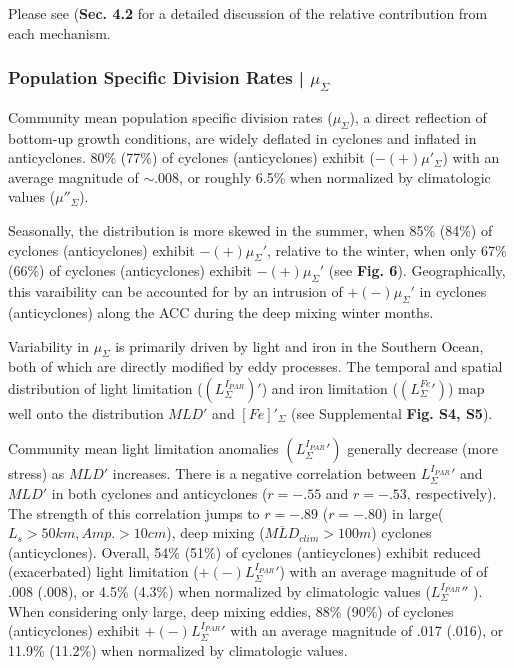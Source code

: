 Please see (\textbf{Sec. 4.2} for a detailed discussion of the relative contribution from each mechanism.  




\subsubsection{Population Specific Division Rates | $\mu_\Sigma$ }

Community mean population specific division rates ($\mu_\Sigma$), a direct reflection of bottom-up growth conditions, are widely deflated in cyclones and inflated in anticyclones. 80\% (77\%) of cyclones (anticyclones) exhibit ($-(+)\mu'_\Sigma$) with an average magnitude of $\sim.008$, or roughly 6.5\% when normalized by climatologic values ($\mu''_\Sigma$). 

Seasonally, the distribution is more skewed in the summer, when 85\% (84\%) of cyclones (anticyclones) exhibit $-(+)\mu_\Sigma'$, relative to the winter, when only 67\% (66\%) of cyclones (anticyclones) exhibit $-(+)\mu_\Sigma'$ (see \textbf{Fig. 6}). Geographically, this varaibility can be accounted for by an intrusion of $+(-)\mu_\Sigma'$ in cyclones (anticyclones) along the ACC during the deep mixing winter months. 

Variability in $\mu_\Sigma$ is primarily driven by light \parencite{Fauchereauresponsephytoplanktonbiomass2011} and iron \parencite{BoydEnvironmentalFactorsControlling2002} in the Southern Ocean, both of which are directly modified by eddy processes. The temporal and spatial distribution of light limitation ($(L_\Sigma^{I_{PAR}})'$) and iron limitation ($(L_\Sigma^{Fe}')$) map well onto the distribution $MLD'$ and $[Fe]'_\Sigma$ (see Supplemental \textbf{Fig. S4, S5}).

Community mean light limitation anomalies $(L_\Sigma^{I_{PAR}}')$ generally decrease (more stress) as $MLD'$ increases. There is a negative correlation between $L_\Sigma^{I_{PAR}}'$ and $MLD'$ in both cyclones and anticyclones ($r=-.55$ and $r=-.53$, respectively). The strength of this correlation jumps to $r=-.89$ ($r=-.80$) in large($L_s>50km, Amp.>10cm$), deep mixing ($\overline{MLD}_{clim}>100m$) cyclones (anticyclones). Overall, 54\% (51\%) of cyclones (anticyclones) exhibit reduced (exacerbated) light limitation ($+(-)L_\Sigma^{I_{PAR}}'$) with an average magnitude of of .008 (.008), or 4.5\% (4.3\%) when normalized by climatologic values ($L_\Sigma^{I_{PAR}}''$ ). When considering only large, deep mixing eddies, 88\% (90\%) of cyclones (anticyclones) exhibit $+(-)L_\Sigma^{I_{PAR}}'$ with an average magnitude of .017 (.016), or 11.9\% (11.2\%) when normalized by climatologic values.

